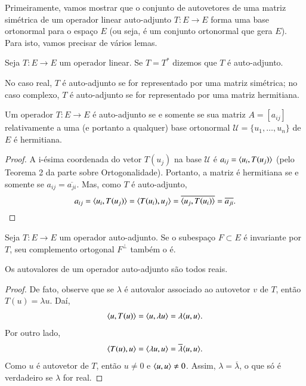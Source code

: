 Primeiramente, vamos mostrar que o conjunto de autovetores de uma matriz simétrica de um operador linear auto-adjunto $T:E\rightarrow E$ forma uma base ortonormal para o espaço $E$ (ou seja, é um conjunto ortonormal que gera $E$). Para isto, vamos precisar de vários lemas.

\begin{defi}
	Seja $T:E\to E$ um operador linear. Se $T=T^*$ dizemos que $T$ é auto-adjunto.
\end{defi}

No caso real, $T$ é auto-adjunto se for representado por uma matriz simétrica; no caso complexo, $T$ é auto-adjunto se for representado por uma matriz hermitiana.

\begin{lema}
  Um operador $T:E\rightarrow E$ é auto-adjunto se e somente se sua matriz $A=[a_{ij}]$ relativamente a uma (e portanto a qualquer) base ortonormal ${\mathcal{U}}=\{u_1,\ldots,u_n\}$ de $E$ é hermitiana.
\end{lema}
\begin{proof}
A i-ésima coordenada do vetor $T(u_j)$ na base ${\mathcal{U}}$ é $a_{ij} = \langle u_i, T(u_j) \rangle$ (pelo Teorema 2 da parte sobre Ortogonalidade). Portanto, a matriz é hermitiana se e somente se $a_{ij} = \overline{a_{ji}}$. Mas, como $T$ é auto-adjunto, 
\begin{equation*}
  a_{ij} = \langle u_i, T(u_j) \rangle = \langle T(u_i), u_j \rangle = \overline{\langle u_j, T(u_i) \rangle} = \overline{a_{ji}}.
\end{equation*}
\end{proof}

\begin{coro}\label{teo:13.2}
  Seja $T:E\rightarrow E$ um operador auto-adjunto. Se o subespaço $F\subset E$ é invariante por $T$, seu complemento ortogonal $F^{\perp}$ também o é.
\end{coro}

\begin{teo}
	Os autovalores de um operador auto-adjunto são todos reais.
\end{teo}
\begin{proof}
	De fato, observe que se $\lambda$ é autovalor associado ao autovetor $v$ de $T$, então $T(u)=\lambda u$. Daí,
    \begin{align*}
    \langle u, T(u) \rangle = \langle u, \lambda u \rangle =\lambda\langle u, u \rangle.
    \end{align*}
    Por outro lado,
    \begin{align*}
    \langle T(u), u \rangle = \langle \lambda u, u \rangle =\overline{\lambda}\langle u, u \rangle.
    \end{align*}
    Como $u$ é autovetor de $T$, então $u\ne 0$ e $\langle u, u \rangle\ne 0$. Assim, $\lambda = \overline{\lambda}$, o que só é verdadeiro se $\lambda$ for real.
\end{proof}

